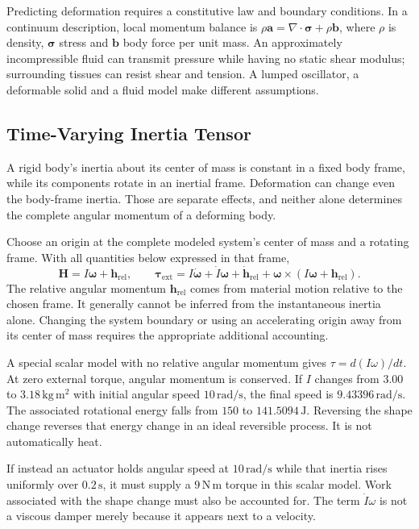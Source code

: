 Predicting deformation requires a constitutive law and boundary conditions. In a continuum description, local momentum balance is $\rho\mathbf a=\nabla\!\cdot\boldsymbol\sigma+\rho\mathbf b$, where $\rho$ is density, $\boldsymbol\sigma$ stress and $\mathbf b$ body force per unit mass. An approximately incompressible fluid can transmit pressure while having no static shear modulus; surrounding tissues can resist shear and tension. A lumped oscillator, a deformable solid and a fluid model make different assumptions.

\subsection{Time-Varying Inertia Tensor}

A rigid body's inertia about its center of mass is constant in a fixed body frame, while its components rotate in an inertial frame. Deformation can change even the body-frame inertia. Those are separate effects, and neither alone determines the complete angular momentum of a deforming body.

Choose an origin at the complete modeled system's center of mass and a rotating frame. With all quantities below expressed in that frame,
\[
\mathbf H=I\boldsymbol\omega+\mathbf h_{\mathrm{rel}},
\qquad
\boldsymbol\tau_{\mathrm{ext}}
=I\dot{\boldsymbol\omega}+\dot I\boldsymbol\omega
+\dot{\mathbf h}_{\mathrm{rel}}
+\boldsymbol\omega\times(I\boldsymbol\omega+\mathbf h_{\mathrm{rel}}).
\]
The relative angular momentum $\mathbf h_{\mathrm{rel}}$ comes from material motion relative to the chosen frame. It generally cannot be inferred from the instantaneous inertia alone. Changing the system boundary or using an accelerating origin away from its center of mass requires the appropriate additional accounting.

A special scalar model with no relative angular momentum gives $\tau=d(I\omega)/dt$. At zero external torque, angular momentum is conserved. If $I$ changes from $3.00$ to $3.18\,\mathrm{kg\,m^2}$ with initial angular speed $10\,\mathrm{rad/s}$, the final speed is $9.43396\,\mathrm{rad/s}$. The associated rotational energy falls from $150$ to $141.5094\,\mathrm J$. Reversing the shape change reverses that energy change in an ideal reversible process. It is not automatically heat.

If instead an actuator holds angular speed at $10\,\mathrm{rad/s}$ while that inertia rises uniformly over $0.2\,\mathrm s$, it must supply a $9\,\mathrm{N\,m}$ torque in this scalar model. Work associated with the shape change must also be accounted for. The term $\dot I\omega$ is not a viscous damper merely because it appears next to a velocity.

